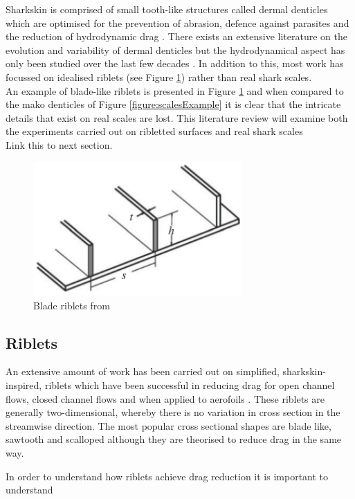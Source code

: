 \documentclass[12pt,oneside,a4paper]{article}
\begin{document}
Sharkskin is comprised of small tooth-like structures called dermal denticles which are optimised for the prevention of abrasion, defence against parasites and the reduction of hydrodynamic drag \citep{fletcher2014}. There exists an extensive literature on the evolution and variability of dermal denticles \citep{reif1985} but the hydrodynamical aspect has only been studied over the last few decades \citep{dean2010}. In addition to this, most work has focussed on idealised riblets (see Figure \ref{figure:literatureReview:bladeRiblets}) rather than real shark scales.
\\
 An example of blade-like riblets is presented in Figure \ref{figure:literatureReview:bladeRiblets} and when compared to the mako denticles of Figure \ref{figure:scalesExample} it is clear that the intricate details that exist on real scales are lost. This literature review will examine both the experiments carried out on ribletted surfaces and real shark scales 
\\
Link this to next section.
%
\begin{figure}[!b]
\centering
\includegraphics[width=8cm]{images/bladeRiblets.png}
\caption{Blade riblets from \cite{dean2010}}
\label{figure:literatureReview:bladeRiblets}
\end{figure}  
%
\subsection{Riblets}
 An extensive amount of work has been carried out on simplified, sharkskin-inspired, riblets which have been successful in reducing drag for open channel flows, closed channel flows and when applied to aerofoils \citep{bixler2013review}. These riblets are generally two-dimensional, whereby there is no variation in cross section in the streamwise direction. The most popular cross sectional shapes are blade like, sawtooth and scalloped although they are theorised to reduce drag in the same way.

In order to understand how riblets achieve drag reduction it is important to understand 
\end{document}
